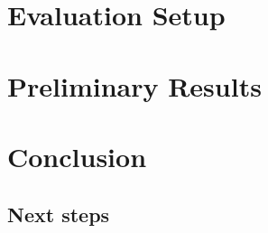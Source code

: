 \documentclass[a4paper]{article}
\begin{document}
\section{Evaluation Setup}


\section{Preliminary Results}



\section{Conclusion}

\subsection{Next steps}




\end{document}
